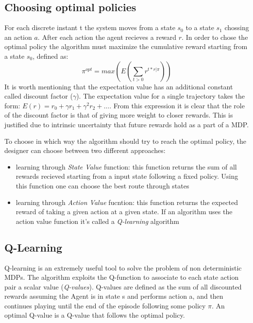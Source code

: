 \subsection{Choosing optimal policies}

For each discrete instant t the system moves from a state $s_{0}$ to a state $s_{1}$ chossing an action $a$. After each action the agent recieves a reward $r$. In order to chose the optimal policy the algorithm must maximize the cumulative reward starting from a state $s_{0}$, defined as: 
\begin{equation}
\pi^{opt} = max(E(\sum_{t>0}r^{t*r|\pi}))
\end{equation}
It is worth mentioning that the expectation value has an additional constant called discount factor ($\gamma$). The expectation value for a single trajectory takes the form: $E(r) = r_{0} + \gamma r_{1} + \gamma^{2} r_{2} + ...$. From this expression it is clear that the role of the discount factor is that of giving more weight to closer rewards. This is justified due to intrinsic uncertainty that future rewards hold as a part of a MDP.

To choose in which way the algorithm should try to reach the optimal policy, the designer can choose between two different approaches:

\begin{itemize}
    \item learning through \emph{State Value} function: this function returns the sum of all rewards recieved starting from a input state following a fixed policy. Using this function one can choose the best route through states
    \item learning through \emph{Action Value} fucntion: this function returns the expected reward of taking a given action at a given state. If an algorithm uses the action value function it's called a \emph{Q-learning} algorithm    
\end{itemize}

\subsection{Q-Learning}

Q-learning is an extremely useful tool to solve the problem of non deterministic MDPs. The algorithm exploits the Q-function to associate to each state action pair a scalar value (\emph{Q-values}). Q-values are defined as the sum of all discounted rewards assuming the Agent is in state s and performs action a, and then continues playing until the end of the episode following some policy $\pi$. An optimal Q-value is a Q-value that follows the optimal policy.

